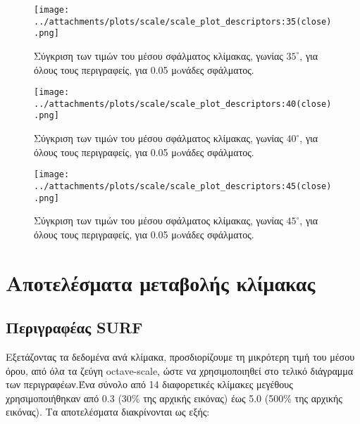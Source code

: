  \begin{figure}[ht!]
\begin{minipage}[b]{1.0\linewidth}
\centering
\texttt{[image: ../attachments/plots/scale/scale\_plot\_descriptors:35(close).png]}
\caption{Σύγκριση των τιμών του μέσου σφάλματος κλίμακας, γωνίας $35^{\circ}$, για όλους τους περιγραφείς, για 0.05 μoνάδες σφάλματος.}
\label{fig:plot_angle_des_35_low}
\end{minipage}
\end{figure} 
\begin{figure}[ht!] 
\begin{minipage}[b]{1.0\linewidth}
\centering
\texttt{[image: ../attachments/plots/scale/scale\_plot\_descriptors:40(close).png]}
\caption{Σύγκριση των τιμών του μέσου σφάλματος κλίμακας, γωνίας $40^{\circ}$, για όλους τους περιγραφείς, για 0.05 μoνάδες σφάλματος.}
\label{fig:plot_angle_des_40_low}
\end{minipage}

 \end{figure} 
 
 \newpage
 
  \begin{figure}[ht!]
\begin{minipage}[b]{1.0\linewidth}
\centering
\texttt{[image: ../attachments/plots/scale/scale\_plot\_descriptors:45(close).png]}
\caption{Σύγκριση των τιμών του μέσου σφάλματος κλίμακας, γωνίας $45^{\circ}$, για όλους τους περιγραφείς, για 0.05 μoνάδες σφάλματος.}
\label{fig:plot_angle_des_45_low}

\end{minipage}

 \end{figure} 
 
 \newpage
 
 \section{Αποτελέσματα μεταβολής κλίμακας}
 
   \subsection{Περιγραφέας SURF}
 
  Εξετάζοντας τα δεδομένα ανά κλίμακα, προσδιορίζουμε τη μικρότερη τιμή του μέσου όρου, από όλα τα ζεύγη octave-scale, ώστε να χρησιμοποιηθεί στο τελικό διάγραμμα των 
  περιγραφέων.Ένα σύνολο από 14 διαφορετικές κλίμακες μεγέθους χρησιμοποιήθηκαν από  0.3 (30\% της αρχικής εικόνας) έως 5.0 (500\% της αρχικής εικόνας). Τα αποτελέσματα διακρίνονται ως εξής:
 
